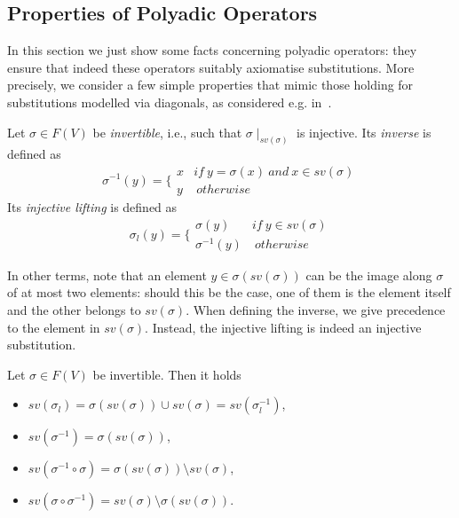 \documentclass{llncs}
\begin{document}

\subsection{Properties of Polyadic Operators}
\label{propo}
In this section we just show some facts concerning
polyadic operators: they ensure that indeed these operators 
suitably axiomatise substitutions. 
%
More precisely, we consider a few simple properties that mimic those holding
for substitutions modelled via diagonals, as considered e.g. in~\cite[Lemma~2 and Lemma~3]{jlamp17}.

\begin{definition}
	\label{def:inverse}
	Let $\sigma \in F(V)$ be \emph{invertible}, i.e., such that $\sigma \mid_{sv(\sigma)}$ is injective.
	Its \emph{inverse} is defined as
	$$\sigma^{-1}(y) = \bigg \{\begin{array}{rl}
	x & \mathit{if} \ y = \sigma(x) \ and \ x \in sv(\sigma) \\
		y & \ otherwise
	\end{array}$$
Its \emph{injective lifting} is defined as
	$$\sigma_l(y) = \bigg \{\begin{array}{ll}
	\sigma(y) & if \ y \in sv(\sigma) \\
	\sigma^{-1}(y) & \ otherwise
	\end{array}$$
\end{definition}

In other terms, note that an element $y \in \sigma(sv(\sigma))$ can be the image along $\sigma$ of at most two elements: 
should this be the case, one of them is the element itself 
and the other belongs to $sv(\sigma)$.
When defining the inverse, we give precedence to the element in $sv(\sigma)$.
%
Instead, the injective lifting is indeed an injective substitution.

\begin{lemma} \label{lemma:Inv0}
Let $\sigma \in F(V)$ be invertible. Then it holds
\begin{itemize}
\item $sv(\sigma_l) = \sigma(sv(\sigma)) \cup sv(\sigma) = sv(\sigma_l^{-1})$,
\item $sv(\sigma^{-1}) = \sigma(sv(\sigma))$,
\item $sv(\sigma^{-1} \circ \sigma) = \sigma(sv(\sigma)) \setminus sv(\sigma)$,
\item $sv(\sigma \circ \sigma^{-1}) = sv(\sigma) \setminus \sigma(sv(\sigma))$.
\end{itemize}
\end{lemma}
\end{document}
